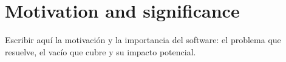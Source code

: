 \section{Motivation and significance}
\label{sec:motivacion}

Escribir aquí la motivación y la importancia del software: el problema que resuelve, el vacío que cubre y su impacto potencial.

